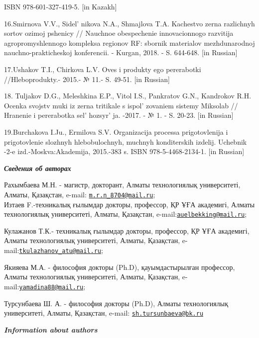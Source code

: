 {{ISBN 978-601-327-419-5. {[}in Kazakh{]}

16.Smirnova V.V., Sidel' nikova N.A., Shmajlova T.A.
Kachestvo zerna razlichnyh sortov ozimoj pshenicy // Nauchnoe
obespechenie innovacionnogo razvitija agropromyshlennogo kompleksa
regionov RF: sbornik materialov mezhdunarodnoj nauchno-prakticheskoj
konferencii. - Kurgan, 2018. - S. 644-648. {[}in Russian{]}

17.Ushakov T.I., Chirkova L.V. Oves i produkty ego pererabotki
//Hleboprodukty.- 2015.- № 11.- S. 49-51. {[}in Russian{]}

18. Tuljakov D.G., Meleshkina E.P., Vitol I.S., Pankratov G.N.,
Kandrokov R.H. Ocenka svojstv muki iz zerna tritikale s
ispol' zovaniem sistemy Miksolab // Hranenie i
pererabotka sel' hozsyr' ja. -2017. - № 1.
- S. 20-23. {[}in Russian{]}

19.Burchakova I.Ju., Ermilova S.V. Organizacija processa prigotovlenija
i prigotovlenie slozhnyh hlebobulochnyh, muchnyh konditerskih izdelij.
Uchebnik -2-e izd.-Moskva:Akademija, 2015.-383 s. ISBN
978-5-4468-2134-1. {[}in Russian{]}

\emph{{\bfseries Сведения об авторах}}

Рахымбаева М.Н. - магистр, докторант, Алматы технологиялық университеті,
Алматы, Қазақстан, e-mail:
\href{mailto:m.r.n_8704@mail.ru}{\nolinkurl{m.r.n\_8704@mail.ru}};\\
Изтаев F.-техникалық ғылымдар докторы, профессор, ҚР ҰҒА академигі,
Алматы технологиялық университеті, Алматы, Қазақстан,
e-mail:\href{mailto:auelbekking@mail.ru}{\nolinkurl{auelbekking@mail.ru}};

Кулажанов Т.К.- техникалық ғылымдар докторы, профессор, ҚР ҰҒА
академигі, Алматы технологиялық университеті, Алматы, Қазақстан,
e-mail:\href{mailto:tkulazhanov_atu@mail.ru}{\nolinkurl{tkulazhanov\_atu@mail.ru}};

Якияева М.А. - философия докторы (Ph.D), қауымдастырылған профессор,
Алматы технологиялық университеті, Алматы, Қазақстан,
e-mail:\href{mailto:yamadina88@mail.ru}{\nolinkurl{yamadina88@mail.ru}};

Турсунбаева Ш. А. - философия докторы (Ph.D), Алматы технологиялық
университеті, Алматы, Қазақстан, e-mail:
\href{mailto:sh.tursunbaeva@bk.ru}{\nolinkurl{sh.tursunbaeva@bk.ru}}
\hl{}

\emph{{\bfseries Information about authors}}

}}
